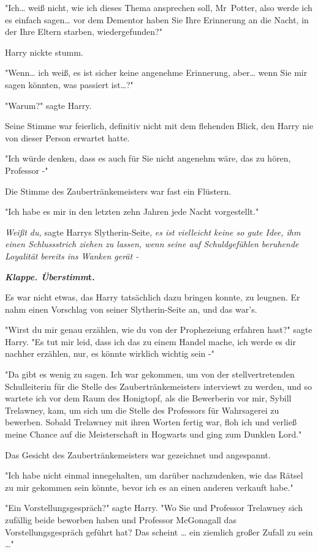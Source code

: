 {"Ich… weiß nicht, wie ich dieses Thema ansprechen soll, Mr~Potter, also werde ich es einfach sagen… vor dem Dementor haben Sie Ihre Erinnerung an die Nacht, in der Ihre Eltern starben, wiedergefunden?"

Harry nickte stumm.

"Wenn… ich weiß, es ist sicher keine angenehme Erinnerung, aber… wenn Sie mir sagen könnten, was passiert ist…?"

"Warum?" sagte Harry.

Seine Stimme war feierlich, definitiv nicht mit dem flehenden Blick, den Harry nie von dieser Person erwartet hatte.

"Ich würde denken, dass es auch für Sie nicht angenehm wäre, das zu hören, Professor -"

Die Stimme des Zaubertränkemeisters war fast ein Flüstern.

"Ich habe es mir in den letzten zehn Jahren jede Nacht vorgestellt."

\emph{Weißt du,} sagte Harrys Slytherin-Seite, \emph{es ist vielleicht keine so gute Idee, ihm einen Schlussstrich ziehen zu lassen, wenn seine auf Schuldgefühlen beruhende Loyalität} \emph{bereits ins Wanken gerät -}

\textbf{\emph{Klappe. Überstimm}t.}

Es war nicht etwas, das Harry tatsächlich dazu bringen konnte, zu leugnen. Er nahm einen Vorschlag von seiner Slytherin-Seite an, und das war's.

"Wirst du mir genau erzählen, wie du von der Prophezeiung erfahren hast?" sagte Harry. "Es tut mir leid, dass ich das zu einem Handel mache, ich werde es dir nachher erzählen, nur, es könnte wirklich wichtig sein -"

"Da gibt es wenig zu sagen. Ich war gekommen, um von der stellvertretenden Schulleiterin für die Stelle des Zaubertränkemeisters interviewt zu werden, und so wartete ich vor dem Raum des Honigtopf, als die Bewerberin vor mir, Sybill Trelawney, kam, um sich um die Stelle des Professors für Wahrsagerei zu bewerben. Sobald Trelawney mit ihren Worten fertig war, floh ich und verließ meine Chance auf die Meisterschaft in Hogwarts und ging zum Dunklen Lord."

Das Gesicht des Zaubertränkemeisters war gezeichnet und angespannt.

"Ich habe nicht einmal innegehalten, um darüber nachzudenken, wie das Rätsel zu mir gekommen sein könnte, bevor ich es an einen anderen verkauft habe."

"Ein Vorstellungsgespräch?" sagte Harry. "Wo Sie und Professor Trelawney sich zufällig beide beworben haben und Professor McGonagall das Vorstellungsgespräch geführt hat? Das scheint … ein ziemlich großer Zufall zu sein …"

}

